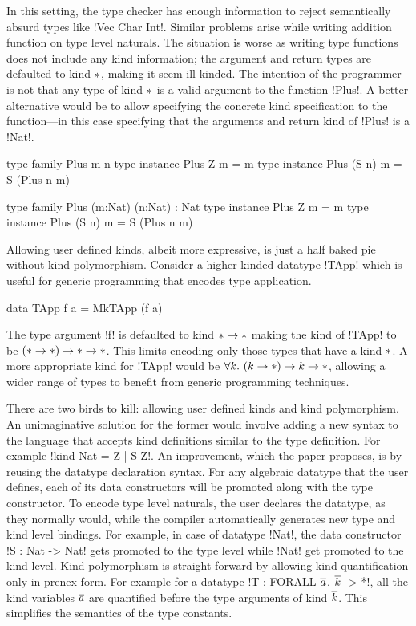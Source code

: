 \documentclass[manuscript,screen,nonacm]{acmart}
\begin{document}
In this setting, the type checker has enough information to reject semantically absurd types like !Vec Char Int!.
Similar problems arise while writing addition function on type level naturals. The situation is worse as writing type functions does not include any kind information; the argument and return types are defaulted to kind $\ast$, making it seem ill-kinded. The intention of the programmer is not that any type of kind $\ast$ is a valid argument to the function !Plus!. A better alternative would be to allow specifying the concrete kind specification to the function---in this case specifying that the arguments and return kind of !Plus! is a !Nat!.

\begin{minipage}[ht]{0.4\linewidth}
 \begin{code}
 type family Plus m n
 type instance Plus Z m = m
 type instance Plus (S n) m = S (Plus n m)
 \end{code}
\end{minipage}
\begin{minipage}[ht]{0.4\linewidth}
 \begin{code}
 type family Plus (m:Nat) (n:Nat) : Nat
 type instance Plus Z m = m
 type instance Plus (S n) m = S (Plus n m)
 \end{code}
\end{minipage}

Allowing user defined kinds, albeit more expressive, is just a half baked pie without kind polymorphism. Consider a higher kinded datatype !TApp! which is useful for generic programming that encodes type application.
\begin{code}
 data TApp f a = MkTApp (f a)
\end{code}

The type argument !f! is defaulted to kind $\ast \to \ast$ making the kind of !TApp! to be $(\ast \to \ast) \to \ast \to \ast$. This limits encoding only those types that have a kind $\ast$. A more appropriate kind for !TApp! would be $\forall k.~(k\to\ast) \to k \to \ast$, allowing a wider range of types to benefit from generic programming techniques.

There are two birds to kill: allowing user defined kinds and kind polymorphism. An unimaginative solution for the former would involve adding a new syntax to the language that accepts kind definitions similar to the type definition. For example !kind Nat = Z | S Z!. An improvement, which the paper proposes, is by reusing the datatype declaration syntax. For any algebraic datatype that the user defines, each of its data constructors will be promoted along with the type constructor. To encode type level naturals, the user declares the datatype, as they normally would, while the compiler automatically generates new type and kind level bindings. For example, in case of datatype !Nat!, the data constructor !S : Nat -> Nat! gets promoted to the type level while !Nat! get promoted to the kind level. Kind polymorphism is straight forward by allowing kind quantification only in prenex form. For example for a datatype !T : FORALL $\overline{a}$. $\overline{k}$ -> *!, all the kind variables $\overline{a}$ are quantified before the type arguments of kind $\overline{k}$. This simplifies the semantics of the type constants.
\end{document}
